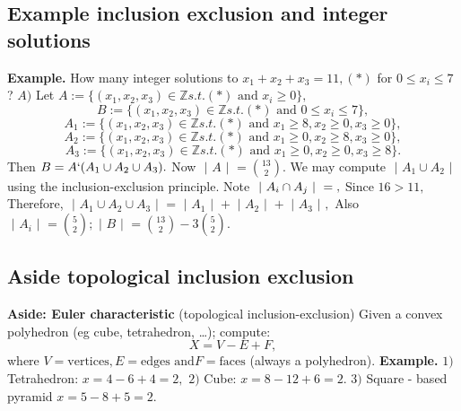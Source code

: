 \documentclass{article}
\begin{document}
\subsection{Example inclusion exclusion and integer solutions}
\textbf{Example. } How many integer solutions to $x_1 + x_2 + x_3 = 11, (*)$ for $0 \leq x_i \leq 7$ ?
\newline
\newline
$A) $ Let $A := \{ (x_1, x_2, x_3) \in \mathbb{Z} s.t. (*) \text{ and } x_i \geq 0\},$
$$B:= \{ (x_1, x_2, x_3) \in \mathbb{Z} s.t. (*) \text{ and } 0 \leq x_i \leq 7\},$$
$$A_1 := \{ (x_1, x_2, x_3) \in \mathbb{Z} s.t. (*) \text{ and } x_1 \geq 8, x_2 \geq 0, x_3 \geq 0\},$$
$$A_2 := \{ (x_1, x_2, x_3) \in \mathbb{Z} s.t. (*) \text{ and } x_1 \geq 0, x_2 \geq 8, x_3 \geq 0\},$$
$$A_3 := \{ (x_1, x_2, x_3) \in \mathbb{Z} s.t. (*) \text{ and } x_1 \geq 0, x_2 \geq 0, x_3 \geq 8\}.$$
Then $B = A `(A_1 \cup A_2 \cup A_3).$
\newline
Now $\text{ | } A \text{ | } = \binom{13}{2}.$
\newline
\newline
We may compute $\text{ | } A_1 \cup A_2 \text{ | }$ using the inclusion-exclusion principle.
\newline
Note $\text{ | } A_i \cap A_j \text{ | } = \null,$
\newline
Since $16 > 11,$
\newline
\newline
Therefore, $\text{ | } A_1 \cup A_2 \cup A_3 \text{ | } = \text{ | } A_1 \text{ | } + \text{ | } A_2 \text{ | }  + \text{ | } A_3 \text{ | },$
Also $\text{ | } A_i \text{ | } = \binom{5}{2}; \text{ | } B \text{ | } =\binom{13}{2} - 3\binom{5}{2}.$
\newpage
\subsection{Aside topological inclusion exclusion}
\textbf{Aside: Euler characteristic} (topological inclusion-exclusion)
\newline
\newline
Given a convex polyhedron (eg cube, tetrahedron, \dots ); compute:
$$X = V - E + F,$$
where $V = \text{vertices}, E = \text{edges and} F = \text{faces}$ (always a polyhedron).
\newline
\newline
\textbf{Example. } 
\newline
$1) $ Tetrahedron: $x = 4 - 6 + 4 = 2,$
\newline
$2) $ Cube: $x = 8 - 12 + 6 = 2.$
\newline
$3) $ Square - based pyramid $x = 5 - 8 + 5 = 2.$
\newpage
\end{document}
